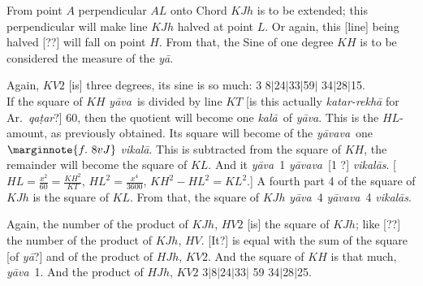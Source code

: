 \documentclass[12pt]{book}
\let\*=\d
\def\kala{\textit{ka\-l\=a}}
\def\ya{\textit{y\=a}}
\def\yava{\textit{y\=ava}}
\def\yavava{\textit{y\=avava}}
\def\vikala{\textit{vi\-ka\-l\=a}}
\def\vikalas{\textit{vi\-ka\-l\=as}}
\def\danda{$|$}
\begin{document}
\newpage

From point $A$ perpendicular $AL$ onto Chord $KJh$ is to be extended; this perpendicular 
will make line $KJh$ halved at point $L$. Or again, this [line] being halved [??] will fall on point $H$.
From that, the Sine of one degree $KH$ is to be considered the measure of the \ya. 

Again, $KV2$ [is] three degrees, its sine is so much: 3 8\danda 24\danda 33\danda 59\danda
34\danda 28\danda 15. \\ 

\iffalse 
\begin{center}
\texttt{[image: 8r.png]}
\captionof{figure}{8r}
\end{center}
\fi 

If the square of $KH$ \yava\ is divided by line $KT$ [is this actually 
\textit{katar-rekh\=a} for Ar.\ \textit{qa\*tar}?] 60, then the quotient  will become
one \kala\ of \yava.   This is the $HL$-amount, as previously obtained. Its square
will become of the \yavava\ one
$\marginnote{f.~8v J}$
\vikala. This is subtracted from the square of $KH$, the remainder will become the
square of $KL$.  And it \yava\ 1  \yavava\ [1 ?] \vikalas. 
[$HL = \frac{x^2}{60} = \frac{KH^2}{KT}$, $HL^2 = \frac{x^4}{3600}$,
$KH^2 - HL^2 = KL^2$.]
A fourth part 4 of the square of $KJh$  is the square of $KL$. From that, 
the square of $KJh$ \yava\ 4 \yavava\ 4 \vikalas. 

Again, the number of the product of $KJh$, $HV2$ [is] the square of $KJh$; like [??]
the number of the product of $KJh$, $HV$. [It?] is equal with the sum of the square [of
\ya?] and of the
product of $HJh$, $KV2$. And the square of $KH$ is that much, \yava\ 1. And the
product of $HJh$, $KV2$ 3\danda 8\danda 24\danda 33\danda
59 34\danda 28\danda 25. 

\newpage
\end{document}
